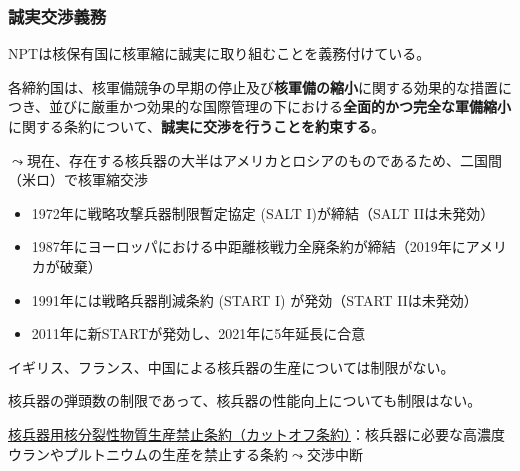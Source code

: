 \documentclass[
  xelatex,
  ja=standard]{bxjsarticle}
\providecommand{\tightlist}{%
  \setlength{\itemsep}{0pt}\setlength{\parskip}{0pt}}\usepackage{longtable,booktabs,array}
\begin{document}
\hypertarget{ux8aa0ux5b9fux4ea4ux6e09ux7fa9ux52d9}{%
\subsubsection{誠実交渉義務}\label{ux8aa0ux5b9fux4ea4ux6e09ux7fa9ux52d9}}

NPTは核保有国に核軍縮に誠実に取り組むことを義務付けている。

\begin{tcolorbox}[enhanced jigsaw, opacityback=0, bottomtitle=1mm, arc=.35mm, opacitybacktitle=0.6, title=\textcolor{quarto-callout-note-color}{\faInfo}\hspace{0.5em}{\href{https://www1.doshisha.ac.jp/~karai/intlaw/docs/npt.htm}{核兵器不拡散条約}　第6条}, bottomrule=.15mm, coltitle=black, toptitle=1mm, titlerule=0mm, leftrule=.75mm, colframe=quarto-callout-note-color-frame, breakable, left=2mm, rightrule=.15mm, toprule=.15mm, colbacktitle=quarto-callout-note-color!10!white, colback=white]

各締約国は、核軍備競争の早期の停止及び\textbf{核軍備の縮小}に関する効果的な措置につき、並びに厳重かつ効果的な国際管理の下における\textbf{全面的かつ完全な軍備縮小}に関する条約について、\textbf{誠実に交渉を行うことを約束する}。

\end{tcolorbox}

\(\leadsto\)現在、存在する核兵器の大半はアメリカとロシアのものであるため、二国間（米ロ）で核軍縮交渉

\begin{itemize}
\tightlist
\item
  1972年に戦略攻撃兵器制限暫定協定 (SALT I)が締結（SALT IIは未発効）
\item
  1987年にヨーロッパにおける中距離核戦力全廃条約が締結（2019年にアメリカが破棄）
\item
  1991年には戦略兵器削減条約 (START I) が発効（START IIは未発効）
\item
  2011年に新STARTが発効し、2021年に5年延長に合意
\end{itemize}

イギリス、フランス、中国による核兵器の生産については制限がない。

核兵器の弾頭数の制限であって、核兵器の性能向上についても制限はない。

\href{https://www.mofa.go.jp/mofaj/gaiko/kaku/fmct/index.html}{核兵器用核分裂性物質生産禁止条約（カットオフ条約）}：核兵器に必要な高濃度ウランやプルトニウムの生産を禁止する条約\(\leadsto\)交渉中断
\end{document}
